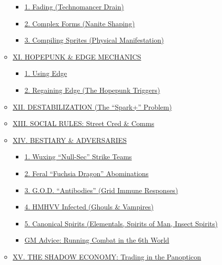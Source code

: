 \documentclass[
  oneside]{article}
\providecommand{\tightlist}{%
  \setlength{\itemsep}{0pt}\setlength{\parskip}{0pt}}
\begin{document}
\begin{multicols}{2}
\begin{itemize}
\begin{itemize}
    \begin{itemize}
    \tightlist
    \item
      \protect\hyperlink{1-fading-technomancer-drain}{1.
      Fading (Technomancer Drain)}
    \item
      \protect\hyperlink{2-complex-forms-nanite-shaping}{2.
      Complex Forms (Nanite Shaping)}
    \item
      \protect\hyperlink{3-compiling-sprites-physical-manifestation}{3.
      Compiling Sprites (Physical Manifestation)}
    \end{itemize}
  \item
    \protect\hyperlink{xi-hopepunk--edge-mechanics}{XI.
    HOPEPUNK \& EDGE MECHANICS}

    \begin{itemize}
    \tightlist
    \item
      \protect\hyperlink{1-using-edge}{1. Using
      Edge}
    \item
      \protect\hyperlink{2-regaining-edge-the-hopepunk-triggers}{2.
      Regaining Edge (The Hopepunk Triggers)}
    \end{itemize}
  \item
    \protect\hyperlink{xii-destabilization-the-spark-problem}{XII.
    DESTABILIZATION (The ``Spark+'' Problem)}
  \item
    \protect\hyperlink{xiii-social-rules-street-cred--comms}{XIII.
    SOCIAL RULES: Street Cred \& Comms}
  \item
    \protect\hyperlink{xiv-bestiary--adversaries}{XIV.
    BESTIARY \& ADVERSARIES}

    \begin{itemize}
    \tightlist
    \item
      \protect\hyperlink{1-wuxing-null-sec-strike-teams}{1.
      Wuxing ``Null-Sec'' Strike Teams}
    \item
      \protect\hyperlink{2-feral-fuchsia-dragon-abominations}{2.
      Feral ``Fuchsia Dragon'' Abominations}
    \item
      \protect\hyperlink{3-god-antibodies-grid-immune-responses}{3.
      G.O.D. ``Antibodies'' (Grid Immune
      Responses)}
    \item
      \protect\hyperlink{4-hmhvv-infected-ghouls--vampires}{4.
      HMHVV Infected (Ghouls \& Vampires)}
    \item
      \protect\hyperlink{5-canonical-spirits-elementals-spirits-of-man-insect-spirits}{5.
      Canonical Spirits (Elementals, Spirits of
      Man, Insect Spirits)}
    \item
      \protect\hyperlink{gm-advice-running-combat-in-the-6th-world}{GM
      Advice: Running Combat in the 6th World}
    \end{itemize}
  \item
    \protect\hyperlink{xv-the-shadow-economy-trading-in-the-panopticon}{XV.
    THE SHADOW ECONOMY: Trading in the Panopticon}


\end{itemize}
\end{itemize}
\end{multicols}
\end{document}
